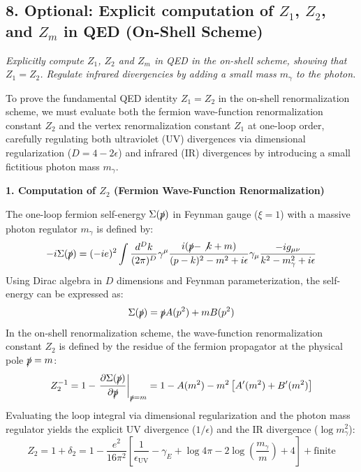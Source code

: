 \subsection*{8. Optional: Explicit computation of $Z_1$, $Z_2$, and $Z_m$ in QED (On-Shell Scheme)}

\begin{center}
    \textit{Explicitly compute $Z_1$, $Z_2$ and $Z_m$ in QED in the on-shell scheme, showing that $Z_1 = Z_2$. Regulate infrared divergencies by adding a small mass $m_\gamma$ to the photon.}
\end{center}

To prove the fundamental QED identity $Z_1 = Z_2$ in the on-shell renormalization scheme, we must evaluate both the fermion wave-function renormalization constant $Z_2$ and the vertex renormalization constant $Z_1$ at one-loop order, carefully regulating both ultraviolet (UV) divergences via dimensional regularization ($D = 4 - 2\epsilon$) and infrared (IR) divergences by introducing a small fictitious photon mass $m_\gamma$.

\textbf{1. Computation of $Z_2$ (Fermion Wave-Function Renormalization)}

The one-loop fermion self-energy $\Sigma(\slashed{p})$ in Feynman gauge ($\xi = 1$) with a massive photon regulator $m_\gamma$ is defined by:
\[
    -i\Sigma(\slashed{p}) = (-ie)^2 \int \frac{d^D k}{(2\pi)^D} \gamma^\mu \frac{i(\slashed{p} - \not{k} + m)}{(p-k)^2 - m^2 + i\epsilon} \gamma_\mu \frac{-ig_{\mu\nu}}{k^2 - m_\gamma^2 + i\epsilon}
\]
Using Dirac algebra in $D$ dimensions and Feynman parameterization, the self-energy can be expressed as:
\[
    \Sigma(\slashed{p}) = \slashed{p} A(p^2) + m B(p^2)
\]
In the on-shell renormalization scheme, the wave-function renormalization constant $Z_2$ is defined by the residue of the fermion propagator at the physical pole $\slashed{p} = m$:
\[
    Z_2^{-1} = 1 - \left. \frac{\partial \Sigma(\slashed{p})}{\partial \slashed{p}} \right|_{\slashed{p} = m} = 1 - A(m^2) - m^2 \left[ A'(m^2) + B'(m^2) \right]
\]
Evaluating the loop integral via dimensional regularization and the photon mass regulator yields the explicit UV divergence ($1/\epsilon$) and the IR divergence ($\log m_\gamma^2$):
\[
    Z_2 = 1 + \delta_2 = 1 - \frac{e^2}{16\pi^2} \left[ \frac{1}{\epsilon_{\text{UV}}} - \gamma_E + \log 4\pi - 2\log\left(\frac{m_\gamma}{m}\right) + 4 \right] + \text{finite}
\]

